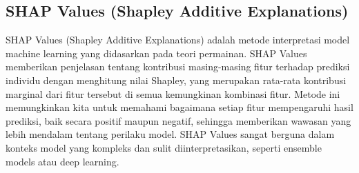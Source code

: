 \subsection{SHAP Values (Shapley Additive Explanations)}
SHAP Values (Shapley Additive Explanations) adalah metode interpretasi model machine learning yang didasarkan pada teori permainan. SHAP Values memberikan penjelasan tentang kontribusi masing-masing fitur terhadap prediksi individu dengan menghitung nilai Shapley, yang merupakan rata-rata kontribusi marginal dari fitur tersebut di semua kemungkinan kombinasi fitur. Metode ini memungkinkan kita untuk memahami bagaimana setiap fitur mempengaruhi hasil prediksi, baik secara positif maupun negatif, sehingga memberikan wawasan yang lebih mendalam tentang perilaku model. SHAP Values sangat berguna dalam konteks model yang kompleks dan sulit diinterpretasikan, seperti ensemble models atau deep learning. \parencite{lundberg2017unified}










